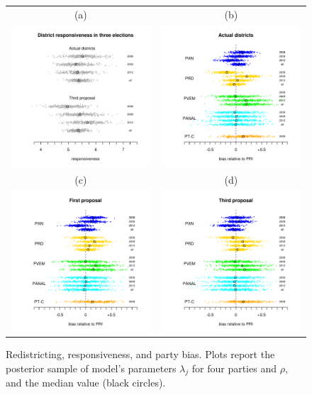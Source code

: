 \documentclass[letter,12pt]{article}
\begin{document}
\begin{figure}
\begin{center}
  \begin{tabular}{cc}
    (a) & (b) \\
    \includegraphics[width=.45\columnwidth]{resp200612s0s3.pdf} &
    \includegraphics[width=.45\columnwidth]{bias200612s0.pdf} \\
    (c) & (d) \\
    \includegraphics[width=.45\columnwidth]{bias200612s1.pdf} &
    \includegraphics[width=.45\columnwidth]{bias200612s3.pdf} 
  \end{tabular}
  \caption{Redistricting, responsiveness, and party bias. Plots report the posterior sample of model's parameters $\lambda_j$ for four parties and $\rho$, and the median value (black circles).}\label{F:posterior_s0s1s3}
\end{center}
\end{figure}
\end{document}
